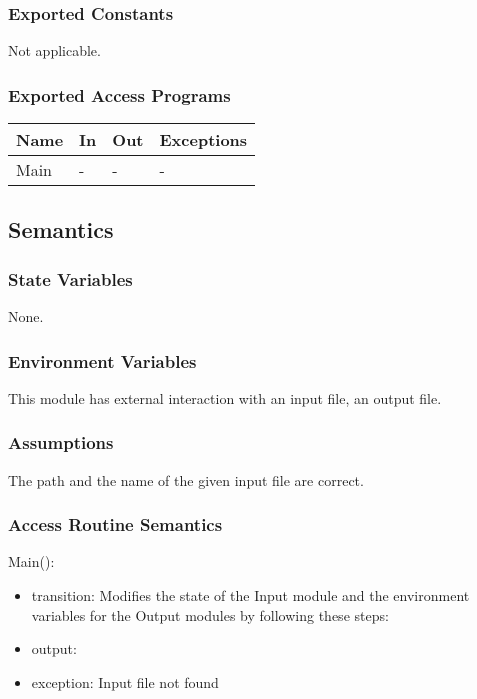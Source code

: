 \documentclass[12pt, titlepage]{article}
\begin{document}
\subsubsection{Exported Constants}
Not applicable.

\subsubsection{Exported Access Programs}

\begin{center}
\begin{tabular}{p{2cm} p{4cm} p{4cm} p{2cm}}
\hline
\textbf{Name} & \textbf{In} & \textbf{Out} & \textbf{Exceptions} \\
\hline
Main & - & - & - \\
\hline
\end{tabular}
\end{center}

\subsection{Semantics}

\subsubsection{State Variables}
None.

\subsubsection{Environment Variables}

This module has external interaction with an input file, an output file.

\subsubsection{Assumptions}

The path and the name of the given input file are correct.

\subsubsection{Access Routine Semantics}

\noindent Main():  
\begin{itemize}
\item transition: Modifies the state of the Input module and the environment variables for the Output modules by following these steps:
\item output: 
\item exception:  Input file not found
\end{itemize}
\end{document}
